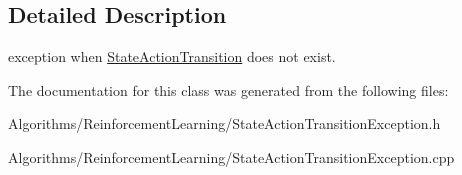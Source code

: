 \subsection{Detailed Description}
exception when \hyperlink{classAI_1_1Algorithm_1_1StateActionTransition}{State\+Action\+Transition} does not exist. 

The documentation for this class was generated from the following files\+:\begin{DoxyCompactItemize}
\item 
Algorithms/\+Reinforcement\+Learning/State\+Action\+Transition\+Exception.\+h\item 
Algorithms/\+Reinforcement\+Learning/State\+Action\+Transition\+Exception.\+cpp\end{DoxyCompactItemize}
